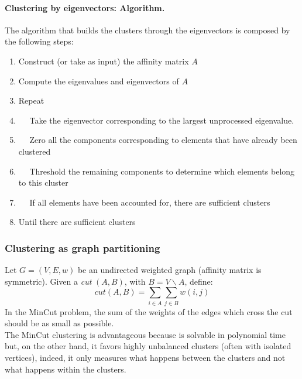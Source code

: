 \paragraph*{Clustering by eigenvectors: Algorithm.} The algorithm that builds the clusters through the eigenvectors is composed by the following steps:
\begin{enumerate}
	\item Construct (or take as input) the affinity matrix $A$
	\item Compute the eigenvalues and eigenvectors of $A$
	\item Repeat
	\item $\quad$ Take the eigenvector corresponding to the largest unprocessed eigenvalue.
	\item $\quad$ Zero all the components corresponding to elements that have already been clustered
	\item $\quad$ Threshold the remaining components to determine which elements belong to this cluster
	\item $\quad$ If all elements have been accounted for, there are sufficient clusters 
	\item Until there are sufficient clusters
\end{enumerate}

\subsubsection{Clustering as graph partitioning}
Let $G=(V,E,w)$ be an undirected weighted graph (affinity matrix is symmetric). Given a \textit{cut} $(A,B)$, with $B=V \backslash A$, define:
$$cut(A,B) = \sum_{i \in A} \sum_{j \in B} w(i,j)$$
In the MinCut problem, the sum of the weights of the edges which cross the cut should be as small as possible.\\
The MinCut clustering is advantageous because is solvable in polynomial time but, on the other hand, it favors highly unbalanced clusters (often with isolated vertices), indeed, it only measures what happens between the clusters and not what happens within the clusters.

